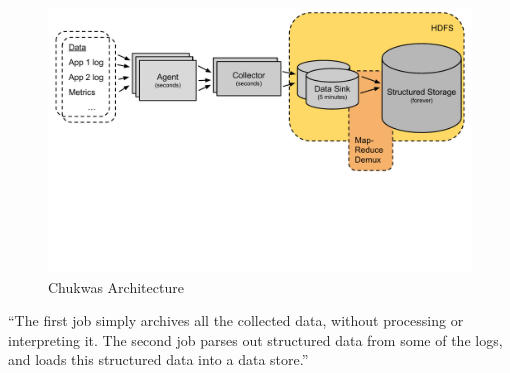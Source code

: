 \begin{figure}[hbt]
  \centering
  \includegraphics[width=\linewidth,clip=true,trim=0 6cm 0 0]{images/ChukwaArchitecture}
  \caption{Chukwas Architecture~\cite{Rabkin2008}}
  \label{fig:ChukwaArchitecture}
\end{figure}

``The first job simply archives all the collected data, without processing or interpreting it. The second job parses out structured data from some of the logs, and loads this structured data into a data store.''~\cite{Boulona} 